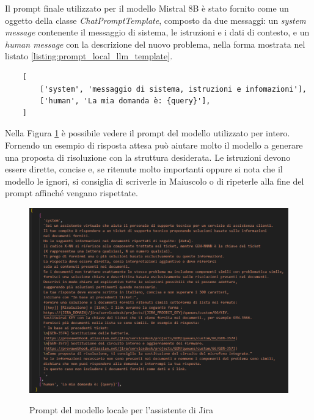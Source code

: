 Il prompt finale utilizzato per il modello Mistral 8B è stato fornito come un oggetto della classe \textit{ChatPromptTemplate}, composto da due messaggi:
un \textit{system message} contenente il messaggio di sistema, le istruzioni e i dati di contesto, e un \textit{human message} con la descrizione del nuovo 
problema, nella forma mostrata nel listato \ref{listing:prompt_local_llm_template}.

\begin{listing}[H]
    \begin{verbatim}
    [
        ['system', 'messaggio di sistema, istruzioni e infomazioni'],
        ['human', 'La mia domanda è: {query}'],
    ]
    \end{verbatim}
    \caption{Forma del prompt del LLM locale per il l'assistente AI di Jira}
    \label{listing:prompt_local_llm_template}
\end{listing}

Nella Figura \ref{fig:jira_llm_prompt} è possibile vedere il prompt del modello utilizzato per intero.
Fornendo un esempio di risposta attesa può aiutare molto il modello a generare una proposta di risoluzione con la struttura desiderata.
Le istruzioni devono essere dirette, concise e, se ritenute molto importanti oppure si nota che il modello le ignori, si consiglia di scriverle in Maiuscolo o di ripeterle alla fine del prompt affinché vengano rispettate.

\begin{figure}[H]
    \centering
    \includegraphics[alt={Prompt del modello locale per l'assistente di Jira}, width=1\columnwidth]{img/jiraLocalLLMPrompt.png}
    \caption{Prompt del modello locale per l'assistente di Jira}
    \label{fig:jira_llm_prompt}
\end{figure}

